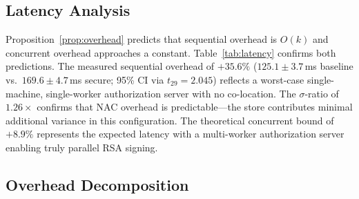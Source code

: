 \documentclass[journal]{IEEEtran}
\theoremstyle{definition}
\begin{document}
\subsection{Latency Analysis}

\begin{table}[h]
\caption{End-to-end latency of the briefing workflow ($N=30$)}
\label{tab:latency}
\centering
\footnotesize
\setlength{\tabcolsep}{3pt}
\end{table}

Proposition~\ref{prop:overhead} predicts that sequential overhead is $O(k)$
and concurrent overhead approaches a constant. Table~\ref{tab:latency}
confirms both predictions. The measured sequential overhead of $+35.6\%$
($125.1 \pm 3.7$\,ms baseline vs.\ $169.6 \pm 4.7$\,ms secure; 95\% CI via
$t_{29} = 2.045$) reflects a worst-case single-machine, single-worker
authorization server with no co-location. The $\sigma$-ratio of $1.26\times$
confirms that NAC overhead is predictable---the store contributes minimal
additional variance in this configuration. The theoretical concurrent bound of $+8.9\%$
represents the expected latency with a multi-worker authorization server enabling
truly parallel RSA signing.

\subsection{Overhead Decomposition}
\label{sec:overhead}
\end{document}
